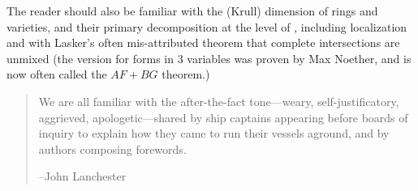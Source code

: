 The reader should also be familiar with the (Krull) dimension of rings and varieties, and their primary decomposition at the level of \cite{Atiyah-MacDonald}, including localization and with Lasker's often mis-attributed theorem that complete intersections are unmixed (the version for forms in 3 variables was proven by
Max Noether, and is now often called the $AF+BG$ theorem.)




\begin{quote}
\small\sf
We are all familiar with the after-the-fact tone---weary, self-justificatory, aggrieved, apologetic---shared by ship captains appearing before boards of inquiry to explain how they came to run their vessels aground, and by authors composing forewords.

--John Lanchester 
\bigskip

\end{quote}



\




